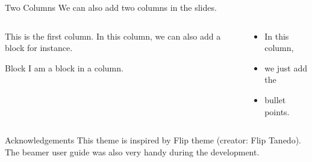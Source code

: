 \documentclass[aspectratio=169]{beamer}
\begin{document}
	\begin{frame}{Two Columns}
		We can also add two columns in the slides.
		\begin{columns}[t]
			\begin{column}[T]{0.4\textwidth}
				This is the first column. In this column, we can also add a block for instance.
				\vspace{1em}
				\begin{block}{Block}
					I am a block in a column.
				\end{block}
			\end{column}
			\begin{column}[T]{0.4\textwidth}
				\begin{itemize}
					\item In this column,
					\item we just add the
					\item bullet points.
				\end{itemize}
			\end{column}
		\end{columns}
	\end{frame}
	\begin{frame}{Acknowledgements}
		This theme is inspired by Flip theme (creator: Flip Tanedo). The beamer user guide was also very handy during the development.
	\end{frame}
\end{document}
